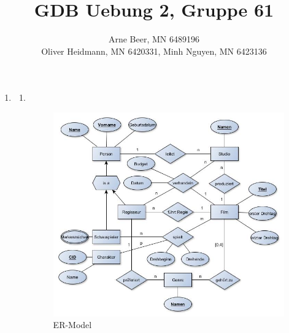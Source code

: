 \documentclass{article}
\title{GDB Uebung 2, Gruppe 61}
\author{Arne Beer, MN 6489196\\
        Oliver Heidmann, MN 6420331,
        Minh Nguyen, MN 6423136}
\begin{document}
    \maketitle
    \begin{enumerate}
        \item   \begin{enumerate}
                        \item $ $ \\ 
                            \begin{figure}[ht!]
                                \centering
                                \includegraphics[width=180mm]{er_model.jpg}
                                \caption{ER-Model}
                                \label{overflow}
                            \end{figure}


\end{enumerate}
\end{enumerate}
\end{document}
